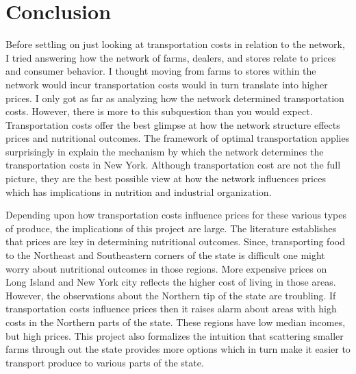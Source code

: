 \documentclass{report}
\begin{document}
\section{Conclusion}
Before settling on just looking at transportation costs in relation to the network, I tried answering how the network of farms, dealers, and stores relate to prices and consumer behavior. I thought moving from farms to stores within the network would incur transportation costs would in turn translate into higher prices. I only got as far as analyzing how the network determined transportation costs. However, there is more to this subquestion than you would expect. Transportation costs offer the best glimpse at how the network structure effects prices and nutritional outcomes. The framework of optimal transportation applies surprisingly in explain the mechanism by which the network determines the transportation costs in New York. Although transportation cost are not the full picture, they are the best possible view at how the network influences prices which has implications in nutrition and industrial organization.

Depending upon how transportation costs influence prices for these various types of produce, the implications of this project are large. The literature establishes that prices are key in determining nutritional outcomes. Since, transporting food to the Northeast and Southeastern corners of the state is difficult one might worry about nutritional outcomes in those regions. More expensive prices on Long Island and New York city reflects the higher cost of living in those areas. However, the observations about the Northern tip of the state are troubling. If transportation costs influence prices then it raises alarm about areas with high costs in the Northern parts of the state. These regions have low median incomes, but high prices. This project also formalizes the intuition that scattering smaller farms through out the state provides more options which in turn make it easier to transport produce to various parts of the state.
\end{document}
